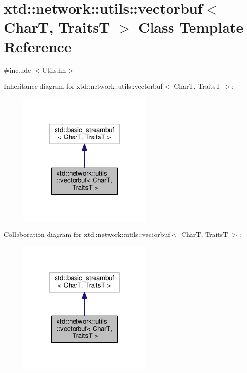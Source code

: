 \hypertarget{classxtd_1_1network_1_1utils_1_1vectorbuf}{}\section{xtd\+:\+:network\+:\+:utils\+:\+:vectorbuf$<$ CharT, TraitsT $>$ Class Template Reference}
\label{classxtd_1_1network_1_1utils_1_1vectorbuf}


{\ttfamily \#include $<$Utils.\+hh$>$}



Inheritance diagram for xtd\+:\+:network\+:\+:utils\+:\+:vectorbuf$<$ CharT, TraitsT $>$\+:
\nopagebreak
\begin{figure}[H]
\begin{center}
\leavevmode
\includegraphics[width=188pt]{classxtd_1_1network_1_1utils_1_1vectorbuf__inherit__graph}
\end{center}
\end{figure}


Collaboration diagram for xtd\+:\+:network\+:\+:utils\+:\+:vectorbuf$<$ CharT, TraitsT $>$\+:
\nopagebreak
\begin{figure}[H]
\begin{center}
\leavevmode
\includegraphics[width=188pt]{classxtd_1_1network_1_1utils_1_1vectorbuf__coll__graph}
\end{center}
\end{figure}
